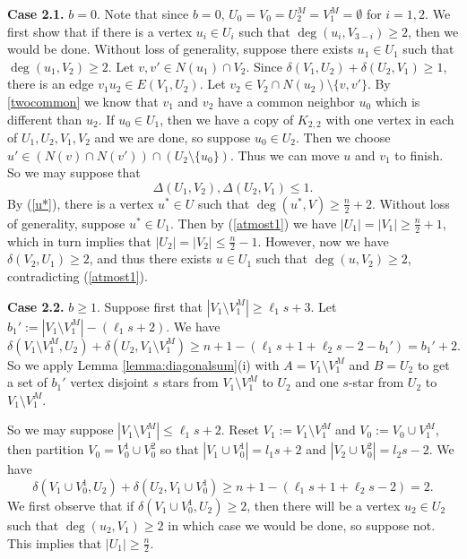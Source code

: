\documentclass[oneside,12pt]{memoir}
\begin{document}
\textbf{Case 2.1.} $b=0$.  Note that since $b=0$, $U_0=V_0=U_2^M=V_1^M=\emptyset$ for $i=1,2$.  We first show that if there is a vertex $u_i\in U_i$ such that $\deg(u_i, V_{3-i})\geq 2$, then we would be done.  Without loss of generality, suppose there exists $u_1\in U_1$ such that $\deg(u_1, V_2)\geq 2$.  Let $v,v'\in N(u_1)\cap V_2$.  Since $\delta(V_1, U_2)+\delta(U_2, V_1)\geq 1$, there is an edge $v_1u_2\in E(V_1, U_2)$.  Let $v_2\in V_2\cap N(u_2)\setminus\{v,v'\}$.  By \eqref{twocommon} we know that $v_1$ and $v_2$ have a common neighbor $u_0$ which is different than $u_2$.  If $u_0\in U_1$, then we have a copy of $K_{2,2}$ with one vertex in each of $U_1, U_2, V_1, V_2$ and we are done, so suppose $u_0\in U_2$.  Then we choose $u'\in (N(v)\cap N(v'))\cap (U_2\setminus\{u_0\})$.  Thus we can move $u$ and $v_1$ to finish.  So we may suppose that 
\begin{equation}\label{atmost1}
\Delta(U_1, V_2), \Delta(U_2, V_1)\leq 1.
\end{equation}
By (\ref{u*}), there is a vertex $u^*\in U$ such that $\deg(u^*, V)\geq \frac{n}{2}+2$.  Without loss of generality, suppose $u^*\in U_1$.  Then by (\ref{atmost1}) we have $|U_1|=|V_1|\geq \frac{n}{2}+1$, which in turn implies that $|U_2|=|V_2|\leq \frac{n}{2}-1$.  However, now we have $\delta(V_2, U_1)\geq 2$, and thus there exists $u\in U_1$ such that $\deg(u, V_2)\geq 2$, contradicting (\ref{atmost1}). 


\textbf{Case 2.2.} $b\geq 1$.  Suppose first that $|V_1\setminus V_1^M|\geq \ell_1s+3$.  Let $b_1':=|V_1\setminus V_1^M|-(\ell_1s+2)$.   We have 
$$
\delta(V_1\setminus V_1^M, U_2)+\delta(U_2, V_1\setminus V_1^M)\geq n+1-(\ell_1s+1+\ell_2s-2-b_1')=b_1'+2.
$$
So we apply Lemma \ref{lemma:diagonalsum}(i) with $A=V_1\setminus V_1^M$ and $B=U_2$ to get a set of $b_1'$ vertex disjoint $s$ stars from $V_1\setminus V_1^M$ to $U_2$ and one $s$-star from $U_2$ to $V_1\setminus V_1^M$.

So we may suppose $|V_1\setminus V_1^M|\leq \ell_1s+2$.  Reset $V_1:=V_1\setminus V_1^M$ and $V_0:=V_0\cup V_1^M$, then partition $V_0=V_0^1\cup V_0^2$ so that $|V_1\cup V_0^1|=l_1s+2$ and $|V_2\cup V_0^2|=l_2s-2$.  We have
\begin{equation}\label{b=1}
\delta(V_1\cup V_0^1, U_2)+\delta(U_2, V_1\cup V_0^1)\geq n+1-(\ell_1s+1+\ell_2s-2)=2.
\end{equation}
We first observe that if $\delta(V_1\cup V_0^1, U_2)\geq 2$, then there will be a vertex $u_2\in U_2$ such that $\deg(u_2, V_1)\geq 2$ in which case we would be done, so suppose not.  This implies that $|U_1|\geq \frac{n}{2}$.
\end{document}
